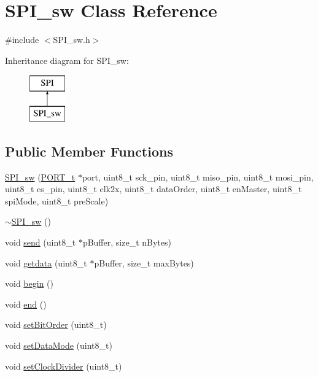 \hypertarget{class_s_p_i__sw}{
\section{SPI\_\-sw Class Reference}
\label{class_s_p_i__sw}
}


{\ttfamily \#include $<$SPI\_\-sw.h$>$}

Inheritance diagram for SPI\_\-sw:\begin{figure}[H]
\begin{center}
\leavevmode
\includegraphics[height=2.000000cm]{class_s_p_i__sw}
\end{center}
\end{figure}
\subsection*{Public Member Functions}
\begin{DoxyCompactItemize}
\item 
\hyperlink{class_s_p_i__sw_a4011529b5f50b920fdc7a2634e7f0b58}{SPI\_\-sw} (\hyperlink{struct_p_o_r_t__struct}{PORT\_\-t} $\ast$port, uint8\_\-t sck\_\-pin, uint8\_\-t miso\_\-pin, uint8\_\-t mosi\_\-pin, uint8\_\-t cs\_\-pin, uint8\_\-t clk2x, uint8\_\-t dataOrder, uint8\_\-t enMaster, uint8\_\-t spiMode, uint8\_\-t preScale)
\item 
\hyperlink{class_s_p_i__sw_a86f122807a6264f203c4c18123eccbec}{$\sim$SPI\_\-sw} ()
\item 
void \hyperlink{class_s_p_i__sw_a49e3cb0b30ef2ff8bbaa1b223a234321}{send} (uint8\_\-t $\ast$pBuffer, size\_\-t nBytes)
\item 
void \hyperlink{class_s_p_i__sw_aa7f2684a7b431419652fc2833b4f2518}{getdata} (uint8\_\-t $\ast$pBuffer, size\_\-t maxBytes)
\item 
void \hyperlink{class_s_p_i__sw_aa5228e93ab0fffe53518994825bb0f18}{begin} ()
\item 
void \hyperlink{class_s_p_i__sw_a2d15c91288c9aa7629b20e3c0f43d11d}{end} ()
\item 
void \hyperlink{class_s_p_i__sw_aa8ef3eb3301d8fa2f14b128197088e58}{setBitOrder} (uint8\_\-t)
\item 
void \hyperlink{class_s_p_i__sw_a6ee0c57a75caaa32f222de669ffb3f73}{setDataMode} (uint8\_\-t)
\item 
void \hyperlink{class_s_p_i__sw_aa4677361fe909a317011db12ec8675e1}{setClockDivider} (uint8\_\-t)
\end{DoxyCompactItemize}


